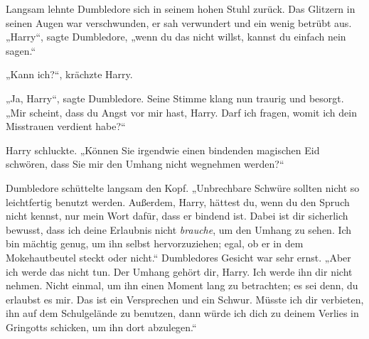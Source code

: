 Langsam lehnte Dumbledore sich in seinem hohen Stuhl zurück. Das Glitzern in seinen Augen war verschwunden, er sah verwundert und ein wenig betrübt aus.
„Harry“, sagte Dumbledore, „wenn du das nicht willst, kannst du einfach nein sagen.“

„Kann ich?“, krächzte Harry.

„Ja, Harry“, sagte Dumbledore. Seine Stimme klang nun traurig und besorgt.
„Mir scheint, dass du Angst vor mir hast, Harry. Darf ich fragen, womit ich dein Misstrauen verdient habe?“

Harry schluckte.
„Können Sie irgendwie einen bindenden magischen Eid schwören, dass Sie mir den Umhang nicht wegnehmen werden?“

Dumbledore schüttelte langsam den Kopf.
„Unbrechbare Schwüre sollten nicht so leichtfertig benutzt werden. Außerdem, Harry, hättest du, wenn du den Spruch nicht kennst, nur mein Wort dafür, dass er bindend ist. Dabei ist dir sicherlich bewusst, dass ich deine Erlaubnis nicht \emph{brauche}, um den Umhang zu sehen. Ich bin mächtig genug, um ihn selbst hervorzuziehen; egal, ob er in dem Mokehautbeutel steckt oder nicht.“ Dumbledores Gesicht war sehr ernst.
„Aber ich werde das nicht tun. Der Umhang gehört dir, Harry. Ich werde ihn dir nicht nehmen. Nicht einmal, um ihn einen Moment lang zu betrachten; es sei denn, du erlaubst es mir. Das ist ein Versprechen und ein Schwur. Müsste ich dir verbieten, ihn auf dem Schulgelände zu benutzen, dann würde ich dich zu deinem Verlies in Gringotts schicken, um ihn dort abzulegen.“

